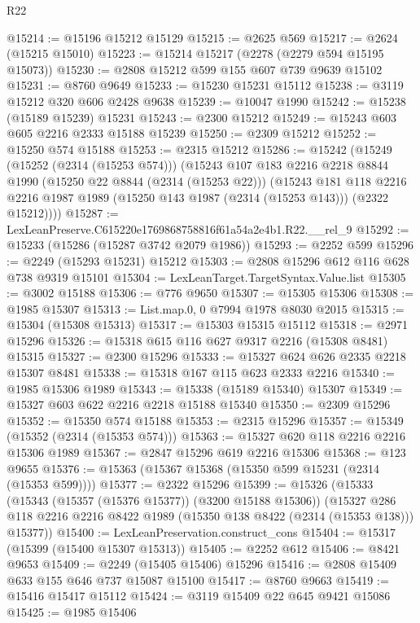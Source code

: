 \begin{lexlean}{R22}
\begin{coremodule}
@15214 := @15196 @15212 @15129
@15215 := @2625 @569
@15217 := @2624 (@15215 @15010)
@15223 := @15214 @15217 (@2278 (@2279 @594 @15195 @15073))
@15230 := @2808 @15212 @599 @155 @607 @739 @9639 @15102
@15231 := @8760 @9649
@15233 := @15230 @15231 @15112
@15238 := @3119 @15212 @320 @606 @2428 @9638
@15239 := @10047 @1990
@15242 := @15238 (@15189 @15239) @15231
@15243 := @2300 @15212
@15249 := @15243 @603 @605 @2216 @2333 @15188 @15239
@15250 := @2309 @15212
@15252 := @15250 @574 @15188
@15253 := @2315 @15212
@15286 := @15242
    (@15249
      (@15252 (@2314 (@15253 @574)))
      (@15243
        @107
        @183
        @2216
        @2218
        @8844
        @1990
        (@15250 @22 @8844 (@2314 (@15253 @22)))
        (@15243
          @181
          @118
          @2216
          @2216
          @1987
          @1989
          (@15250 @143 @1987 (@2314 (@15253 @143)))
          (@2322 @15212))))
@15287 := LexLeanPreserve.C615220e1769868758816f61a54a2e4b1.R22.__rel_9
@15292 := @15233 (@15286 (@15287 @3742 @2079 @1986))
@15293 := @2252 @599
@15296 := @2249 (@15293 @15231) @15212
@15303 := @2808 @15296 @612 @116 @628 @738 @9319 @15101
@15304 := LexLeanTarget.TargetSyntax.Value.list
@15305 := @3002 @15188
@15306 := @776 @9650
@15307 := @15305 @15306
@15308 := @1985 @15307
@15313 := List.map.{0, 0} @7994 @1978 @8030 @2015
@15315 := @15304 (@15308 @15313)
@15317 := @15303 @15315 @15112
@15318 := @2971 @15296
@15326 := @15318 @615 @116 @627 @9317 @2216 (@15308 @8481) @15315
@15327 := @2300 @15296
@15333 := @15327 @624 @626 @2335 @2218 @15307 @8481
@15338 := @15318 @167 @115 @623 @2333 @2216
@15340 := @1985 @15306 @1989
@15343 := @15338 (@15189 @15340) @15307
@15349 := @15327 @603 @622 @2216 @2218 @15188 @15340
@15350 := @2309 @15296
@15352 := @15350 @574 @15188
@15353 := @2315 @15296
@15357 := @15349 (@15352 (@2314 (@15353 @574)))
@15363 := @15327 @620 @118 @2216 @2216 @15306 @1989
@15367 := @2847 @15296 @619 @2216 @15306
@15368 := @123 @9655
@15376 := @15363 (@15367 @15368 (@15350 @599 @15231 (@2314 (@15353 @599))))
@15377 := @2322 @15296
@15399 := @15326
    (@15333
      (@15343 (@15357 (@15376 @15377)) (@3200 @15188 @15306))
      (@15327 @286 @118 @2216 @2216 @8422 @1989 (@15350 @138 @8422 (@2314 (@15353 @138))) @15377))
@15400 := LexLeanPreservation.construct_cons
@15404 := @15317 (@15399 (@15400 @15307 @15313))
@15405 := @2252 @612
@15406 := @8421 @9653
@15409 := @2249 (@15405 @15406) @15296
@15416 := @2808 @15409 @633 @155 @646 @737 @15087 @15100
@15417 := @8760 @9663
@15419 := @15416 @15417 @15112
@15424 := @3119 @15409 @22 @645 @9421 @15086
@15425 := @1985 @15406

\end{coremodule}
\end{lexlean}
